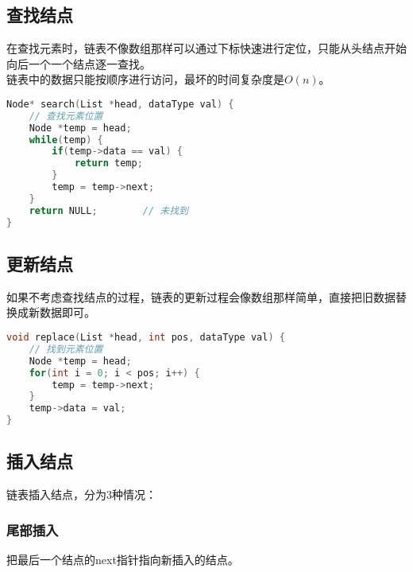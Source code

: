 \subsection{查找结点}

在查找元素时，链表不像数组那样可以通过下标快速进行定位，只能从头结点开始向后一个一个结点逐一查找。 \\

链表中的数据只能按顺序进行访问，最坏的时间复杂度是$ O(n) $。 \\


\begin{lstlisting}[language=C]
Node* search(List *head, dataType val) {
    // 查找元素位置
    Node *temp = head;
    while(temp) {
        if(temp->data == val) {
            return temp;
        }
        temp = temp->next;
    }
    return NULL;        // 未找到
}
\end{lstlisting}

\subsection{更新结点}

如果不考虑查找结点的过程，链表的更新过程会像数组那样简单，直接把旧数据替换成新数据即可。 \\


\begin{lstlisting}[language=C]
void replace(List *head, int pos, dataType val) {
    // 找到元素位置
    Node *temp = head;
    for(int i = 0; i < pos; i++) {
        temp = temp->next;
    }
    temp->data = val;
}
\end{lstlisting}

\subsection{插入结点}

链表插入结点，分为3种情况：

\subsubsection{尾部插入}

把最后一个结点的next指针指向新插入的结点。

